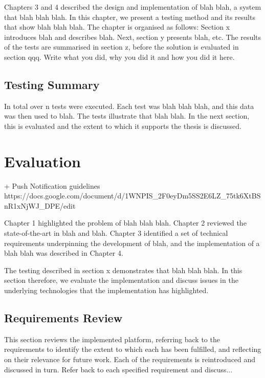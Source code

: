 Chapters 3 and 4 described the design and implementation of blah blah, a system that blah blah blah.  In this chapter, we present a testing method and its results that show blah blah blah.  The chapter is organised as follows:  Section x introduces blah and describes blah.  Next, section y presents blah, etc.  
The results of the tests are summarised in section z, before the solution is evaluated in section qqq.
Write what you did, why you did it and how you did it here.

\subsection{Testing Summary}

In total over n tests were executed. Each test was blah blah blah, and this data was then used to blah. The tests illustrate that blah blah. In the next section, this is evaluated and the extent to which it supports the thesis is discussed.

\section{Evaluation}


+ Push Notification guidelines https://docs.google.com/document/d/1WNPIS_2F0eyDm5SS2E6LZ_75tk6XtBSnR1xNjWJ_DPE/edit

Chapter 1 highlighted the problem of blah blah blah. Chapter 2 reviewed the state-of-the-art in blah and blah.  Chapter 3 identified a set of technical requirements underpinning the development of blah, and the implementation of a blah blah was described in Chapter 4.

The testing described in section x demonstrates that blah blah blah. In this section therefore, we evaluate the implementation and discuss issues in the underlying technologies that the implementation has highlighted.

    \subsection{Requirements Review} \label{s-i--requirements-review}
    
    This section reviews the implemented platform, referring back to the requirements to identify the extent to which each has been fulfilled, and reflecting on their relevance for future work. Each of the requirements is reintroduced and discussed in turn.
    Refer back to each specified requirement and discuss...
    
